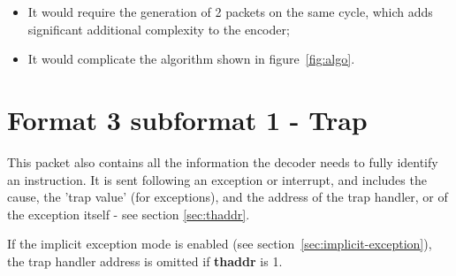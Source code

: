 \begin{itemize}
  \item It would require the generation of 2 packets on the same cycle, which adds significant additional complexity
    to the encoder;
  \item It would complicate the algorithm shown in figure~\ref{fig:algo}. 
\end{itemize}

\FloatBarrier
\section{Format 3 subformat 1 - Trap} \label{sec:format31}

This packet also contains all the information the decoder needs to fully identify an instruction.
It is sent following an exception or interrupt, and includes the cause, 
the 'trap value' (for exceptions), and the address of the trap handler, or
of the exception itself - see section \ref{sec:thaddr}.  

If the implicit exception mode is enabled (see section~\ref{sec:implicit-exception}), the trap handler 
address is omitted if \textbf{thaddr} is 1.

